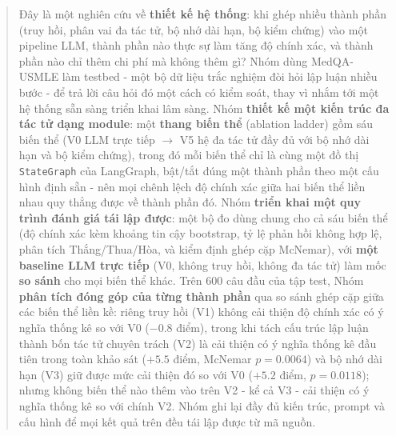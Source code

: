 \documentclass[11pt]{article}
\begin{document}
\begin{abstract}
Đây là một nghiên cứu về \textbf{thiết kế hệ thống}: khi ghép nhiều thành phần (truy hồi, phân vai đa
tác tử, bộ nhớ dài hạn, bộ kiểm chứng) vào một pipeline LLM, thành phần nào thực sự làm tăng độ chính
xác, và thành phần nào chỉ thêm chi phí mà không thêm gì? Nhóm dùng MedQA-USMLE làm testbed - một bộ dữ
liệu trắc nghiệm đòi hỏi lập luận nhiều bước - để trả lời câu hỏi đó một cách có kiểm soát, thay vì nhắm
tới một hệ thống sẵn sàng triển khai lâm sàng. Nhóm \textbf{thiết kế một kiến trúc đa tác tử dạng
module}: một \textbf{thang biến thể} (ablation ladder) gồm sáu biến thể (V0 LLM trực tiếp
$\rightarrow$ V5 hệ đa tác tử đầy đủ với bộ nhớ dài hạn và bộ kiểm chứng), trong đó mỗi biến thể chỉ là
cùng một đồ thị \texttt{StateGraph} của LangGraph, bật/tắt đúng một thành phần theo một cấu hình định
sẵn - nên mọi chênh lệch độ chính xác giữa hai biến thể liền nhau quy thẳng được về thành phần đó. Nhóm
\textbf{triển khai một quy trình đánh giá tái lập được}: một bộ đo dùng chung cho cả sáu biến thể (độ
chính xác kèm khoảng tin cậy bootstrap, tỷ lệ phản hồi không hợp lệ, phân tích Thắng/Thua/Hòa, và kiểm
định ghép cặp McNemar), với \textbf{một baseline LLM trực tiếp} (V0, không truy hồi, không đa tác tử)
làm mốc \textbf{so sánh} cho mọi biến thể khác. Trên 600 câu đầu của tập test, Nhóm \textbf{phân tích
đóng góp của từng thành phần} qua so sánh ghép cặp giữa các biến thể liền kề: riêng truy hồi (V1) không
cải thiện độ chính xác có ý nghĩa thống kê so với V0 ($-0.8$ điểm), trong khi tách cấu trúc lập luận
thành bốn tác tử chuyên trách (V2) là cải thiện có ý nghĩa thống kê đầu tiên trong toàn khảo sát
($+5.5$ điểm, McNemar $p{=}0.0064$) và bộ nhớ dài hạn (V3) giữ được mức cải thiện đó so với V0
($+5.2$ điểm, $p{=}0.0118$); nhưng không biến thể nào thêm vào trên V2 - kể cả V3 - cải thiện có ý
nghĩa thống kê so với chính V2. Nhóm ghi lại đầy đủ kiến trúc, prompt và cấu hình để mọi kết quả trên
đều tái lập được từ mã nguồn.
\end{abstract}
\bigskip

\end{document}
